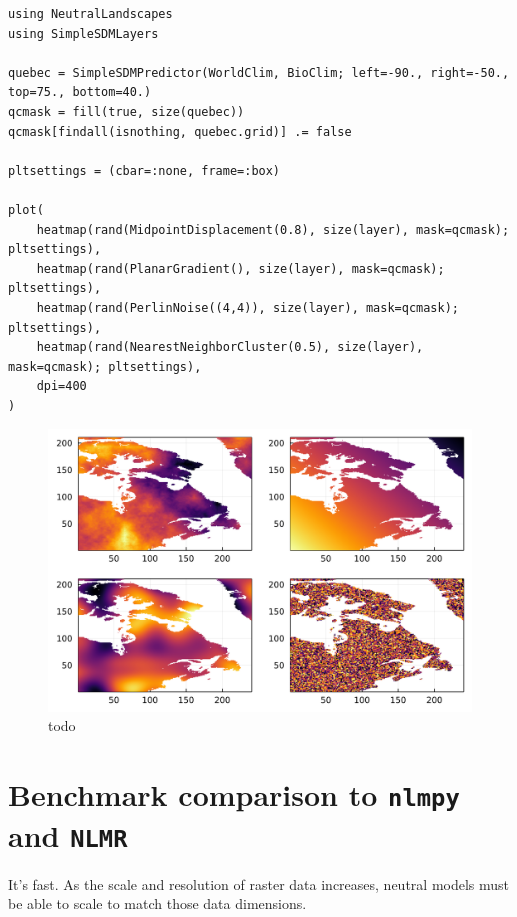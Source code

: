 \documentclass[11pt]{article}
\makeatletter
\def\maxwidth{\ifdim\Gin@nat@width>\linewidth\linewidth
\else\Gin@nat@width\fi}
\let\Oldincludegraphics\includegraphics
\renewcommand{\includegraphics}[1]{\Oldincludegraphics[width=\maxwidth]{#1}}
\makeatother
\begin{document}
\begin{verbatim}
using NeutralLandscapes
using SimpleSDMLayers

quebec = SimpleSDMPredictor(WorldClim, BioClim; left=-90., right=-50., top=75., bottom=40.)
qcmask = fill(true, size(quebec))
qcmask[findall(isnothing, quebec.grid)] .= false

pltsettings = (cbar=:none, frame=:box)

plot(
    heatmap(rand(MidpointDisplacement(0.8), size(layer), mask=qcmask); pltsettings),
    heatmap(rand(PlanarGradient(), size(layer), mask=qcmask); pltsettings),
    heatmap(rand(PerlinNoise((4,4)), size(layer), mask=qcmask); pltsettings),
    heatmap(rand(NearestNeighborCluster(0.5), size(layer), mask=qcmask); pltsettings),
    dpi=400
)
\end{verbatim}

\begin{figure}
\centering
\includegraphics{./figures/interoperable.png}
\caption{todo}
\end{figure}

\hypertarget{benchmark-comparison-to-nlmpy-and-nlmr}{%
\section{\texorpdfstring{Benchmark comparison to \texttt{nlmpy} and
\texttt{NLMR}}{Benchmark comparison to nlmpy and NLMR}}\label{benchmark-comparison-to-nlmpy-and-nlmr}}

It's fast. As the scale and resolution of raster data increases, neutral
models must be able to scale to match those data dimensions.
\end{document}
